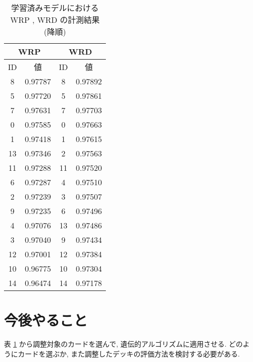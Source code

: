 \documentclass{jarticle}     %
\begin{document}
\begin{table}[t]
  \caption{学習済みモデルにおける WRP , WRD の計測結果 (降順)}
  \centering
  \label{table:WRPWRD}
  \begin{tabular}{|cc|cc|}
  \hline
  \multicolumn{2}{|c|}{WRP}          & \multicolumn{2}{c|}{WRD}          \\ \hline
  \multicolumn{1}{|c|}{ID} & 値       & \multicolumn{1}{c|}{ID} & 値       \\ \hline
  \multicolumn{1}{|c|}{8}  & 0.97787 & \multicolumn{1}{c|}{8}  & 0.97892 \\ \hline
  \multicolumn{1}{|c|}{5}  & 0.97720 & \multicolumn{1}{c|}{5}  & 0.97861 \\ \hline
  \multicolumn{1}{|c|}{7}  & 0.97631 & \multicolumn{1}{c|}{7}  & 0.97703 \\ \hline
  \multicolumn{1}{|c|}{0}  & 0.97585 & \multicolumn{1}{c|}{0}  & 0.97663 \\ \hline
  \multicolumn{1}{|c|}{1}  & 0.97418 & \multicolumn{1}{c|}{1}  & 0.97615 \\ \hline
  \multicolumn{1}{|c|}{13} & 0.97346 & \multicolumn{1}{c|}{2}  & 0.97563 \\ \hline
  \multicolumn{1}{|c|}{11} & 0.97288 & \multicolumn{1}{c|}{11} & 0.97520 \\ \hline
  \multicolumn{1}{|c|}{6}  & 0.97287 & \multicolumn{1}{c|}{4}  & 0.97510 \\ \hline
  \multicolumn{1}{|c|}{2}  & 0.97239 & \multicolumn{1}{c|}{3}  & 0.97507 \\ \hline
  \multicolumn{1}{|c|}{9}  & 0.97235 & \multicolumn{1}{c|}{6}  & 0.97496 \\ \hline
  \multicolumn{1}{|c|}{4}  & 0.97076 & \multicolumn{1}{c|}{13} & 0.97486 \\ \hline
  \multicolumn{1}{|c|}{3}  & 0.97040 & \multicolumn{1}{c|}{9}  & 0.97434 \\ \hline
  \multicolumn{1}{|c|}{12} & 0.97001 & \multicolumn{1}{c|}{12} & 0.97384 \\ \hline
  \multicolumn{1}{|c|}{10} & 0.96775 & \multicolumn{1}{c|}{10} & 0.97304 \\ \hline
  \multicolumn{1}{|c|}{14} & 0.96474 & \multicolumn{1}{c|}{14} & 0.97178 \\ \hline
  \end{tabular}
  \end{table}

\section{今後やること}
表 \ref{table:WRPWRD} から調整対象のカードを選んで, 遺伝的アルゴリズムに適用させる. どのようにカードを選ぶか, また調整したデッキの評価方法を検討する必要がある. 
\end{document}
